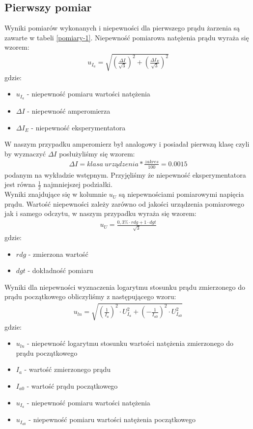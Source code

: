 \documentclass[a4paper]{article}
\newlength{\du}
\begin{document}
\subsection{Pierwszy pomiar}
Wyniki pomiarów wykonanych i niepewności dla pierwszego prądu żarzenia są zawarte w tabeli \ref{pomiary-1}. Niepewność pomiarowa natężenia prądu wyraża się wzorem: 
\begin{align*}
u_{I_{a}} = \sqrt{(\frac{\Delta I}{\sqrt{3}})^2 + (\frac{\Delta I_{E}}{\sqrt{3}})^2}
\end{align*}
gdzie:
\begin{itemize}
\item $u_{I_{a}}$ - niepewność pomiaru wartości natężenia \\
\item $\Delta I$ - niepewność amperomierza \\
\item $\Delta I_{E}$ - niepewność eksperymentatora\\
\end{itemize}

W naszym przypadku amperomierz był analogowy i posiadał pierwszą klasę czyli by wyznaczyć $\Delta I$ posłużyliśmy się wzorem:
\begin{align*}
\Delta I = klasa\ urządzenia * \frac{zakres}{100} = 0.0015
\end{align*}
podanym na wykładzie wstępnym.
Przyjęliśmy że niepewność eksperymentatora jest równa $\frac{1}{2}$ najmniejszej podziałki.\\

Wyniki znajdujące się w kolumnie $u_{U}$ są niepewnościami pomiarowymi napięcia prądu. Wartość niepewności zależy zarówno od jakości urządzenia pomiarowego jak i samego odczytu, w naszym przypadku wyraża się wzorem:
\begin{align*}
u_{U} = \frac{0,3 \% \cdot rdg + 1 \cdot dgt}{\sqrt{3}}
\end{align*}
gdzie:
 \begin{itemize}
\item $rdg$ - zmierzona wartość 
\item $dgt$ - dokładność pomiaru 
\end{itemize}

Wyniki dla niepewności wyznaczenia logarytmu stosunku prądu zmierzonego do prądu początkowego obliczyliśmy z następującego wzoru:
\begin{align*}
u_{ln} = \sqrt{(\frac{1}{I_{a}})^2 \cdot U_{I_{a}}^2 + (- \frac{1}{I_{a0}})^2 \cdot U_{I_{a0}}^2 }
\end{align*}
gdzie:
\begin{itemize}
\item $u_{ln}$ - niepewność logarytmu stosunku wartości natężenia zmierzonego do prądu początkowego
\item $I_{a}$ - wartość zmierzonego prądu
\item $I_{a0}$ - wartość prądu początkowego
\item $u_{I_{a}}$ - niepewność pomiaru wartości natężenia
\item $u_{I_{a0}}$ - niepewność pomiaru wartości natężenia początkowego 
\end{itemize}
\end{document}
